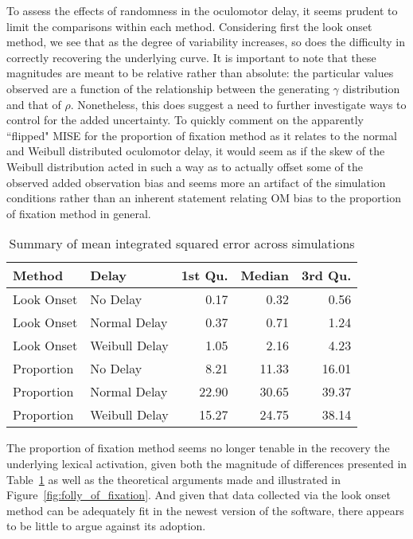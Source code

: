 To assess the effects of randomness in the oculomotor delay, it seems prudent to limit the comparisons within each method. Considering first the look onset method, we see that as the degree of variability increases, so does the difficulty in correctly recovering the underlying curve. It is important to note that these magnitudes are meant to be relative rather than absolute: the particular values observed are a function of the relationship between the generating $\gamma$ distribution and that of $\rho$. Nonetheless, this does suggest a need to further investigate ways to control for the added uncertainty. To quickly comment on the apparently ``flipped" MISE for the proportion of fixation method as it relates to the normal and Weibull distributed oculomotor delay, it would seem as if the skew of the Weibull distribution acted in such a way as to actually offset some of the observed added observation bias and seems more an artifact of the simulation conditions rather than an inherent statement relating OM bias to the proportion of fixation method in general.

\begin{table}[H]
\centering
\begin{tabular}{llrrr}
  \hline
Method & Delay & 1st Qu. & Median & 3rd Qu. \\ 
  \hline
Look Onset & No Delay & 0.17 & 0.32 & 0.56 \\ 
  Look Onset & Normal Delay & 0.37 & 0.71 & 1.24 \\ 
  Look Onset & Weibull Delay & 1.05 & 2.16 & 4.23 \\ 
  Proportion & No Delay & 8.21 & 11.33 & 16.01 \\ 
  Proportion & Normal Delay & 22.90 & 30.65 & 39.37 \\ 
  Proportion & Weibull Delay & 15.27 & 24.75 & 38.14 \\ 
   \hline
\end{tabular}
\caption{Summary of mean integrated squared error across simulations}
\label{tab:mise_sims}
\end{table}

The proportion of fixation method seems no longer tenable in the recovery the underlying lexical activation, given both the magnitude of differences presented in Table~\ref{tab:mise_sims} as well as the theoretical arguments made and illustrated in Figure~\ref{fig:folly_of_fixation}. And given that data collected via the look onset method can be adequately fit in the newest version of the  software, there appears to be little to argue against its adoption.

